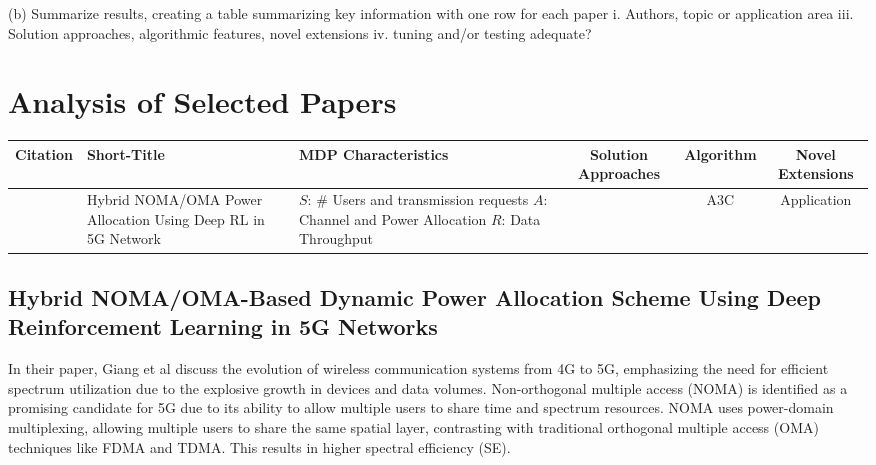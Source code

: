 \documentclass[journal]{IEEEtran}
\begin{document}
(b) Summarize results, creating a table summarizing key information with one row for each paper 
i. Authors, topic or application area
iii. Solution approaches, algorithmic features, novel extensions
iv. tuning and/or testing adequate?



\section{Analysis of Selected Papers}
\label{sec:selected_papers}

\begin{table*}
    \begin{tabularx}{\textwidth}{cX X ccc}
        Citation & Short-Title & MDP Characteristics & Solution Approaches & Algorithm &
        Novel Extensions\\
        \midrule
        \cite{giang2020} & Hybrid NOMA/OMA Power Allocation Using Deep RL in 5G Network & 
        $S$: \# Users and transmission requests \newline
        $A$: Channel and Power Allocation \newline
        $R$: Data Throughput &
        & A3C\cite{mnih2016} & Application
    \end{tabularx}
\end{table*}

%
%
\begin{table*}
\end{table*}


\subsection{Hybrid NOMA/OMA-Based Dynamic Power Allocation Scheme 
Using Deep Reinforcement Learning in 5G Networks}

In their paper\cite{giang2020}, Giang et al discuss the evolution of wireless communication systems
from 4G to 5G, emphasizing the need for efficient spectrum utilization due to the explosive growth 
in devices and data volumes. Non-orthogonal multiple access (NOMA) is identified as a promising 
candidate for 5G due to its ability to allow multiple users to share time and spectrum resources.
NOMA uses power-domain multiplexing, allowing multiple users to share the same spatial layer, 
contrasting with traditional orthogonal multiple access (OMA) techniques like FDMA and TDMA. 
This results in higher spectral efficiency (SE).
\end{document}
